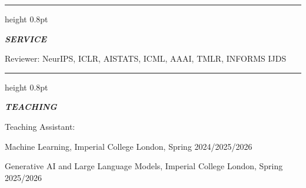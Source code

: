 \documentclass[11pt,letterpaper]{article}
\newcommand{\cvsection}[1]{%
  \vspace{8pt}%
  {\color{ruleblue}\hrule height 0.8pt}%
  \vspace{2pt}%
  {\fontsize{15}{17}\selectfont\bfseries\itshape #1}\par
  \vspace{3pt}%
}
\begin{document}
\cvsection{SERVICE}

\hspace{0.40in}Reviewer: NeurIPS, ICLR, AISTATS, ICML, AAAI, TMLR, INFORMS IJDS

\cvsection{TEACHING}

\begin{list}{}{\setlength{\leftmargin}{0.40in}\setlength{\rightmargin}{0.15in}\setlength{\topsep}{0pt}\setlength{\itemsep}{1pt}}
  \item[] Teaching Assistant:
  \item[] Machine Learning, Imperial College London, Spring 2024/2025/2026
  \item[] Generative AI and Large Language Models, Imperial College London, Spring 2025/2026
\end{list}
\end{document}
